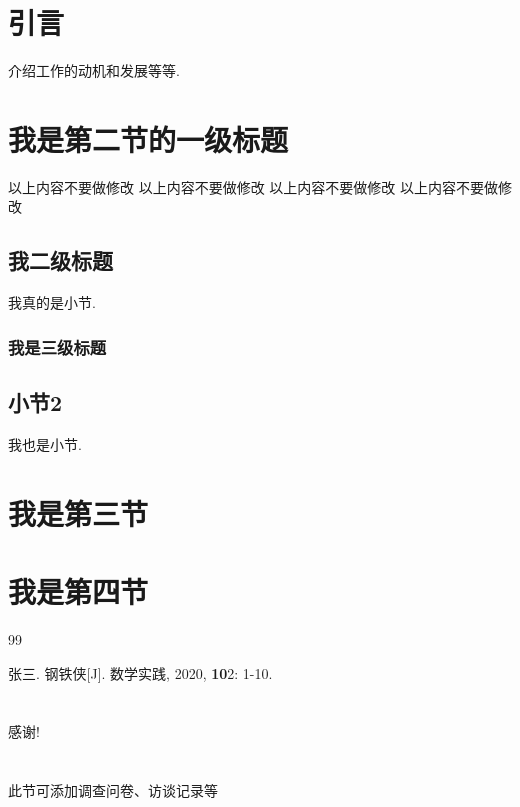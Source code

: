 \documentclass[a4paper,12pt,twoside]{ctexart}
\begin{document}
\newpage %
\pagestyle{empty}
\tableofcontents      %
\newpage %

\newpage
\section{引言}
    介绍工作的动机和发展等等.
\section{我是第二节的一级标题}
以上内容不要做修改 以上内容不要做修改 以上内容不要做修改 以上内容不要做修改
\subsection{我二级标题}
    我真的是小节.
\subsubsection{我是三级标题}
\subsection{小节2}
    我也是小节.

\section{我是第三节}
\section{我是第四节}
\newpage

\begin{thebibliography}{99}
\setlength{\itemsep}{-0.75ex}
张三. 钢铁侠[J]. 数学实践, 2020, \textbf{10}2: 1-10.
\end{thebibliography}
\newpage
\section*{}
感谢!
\newpage
\section*{}
此节可添加调查问卷、访谈记录等
\end{document}
